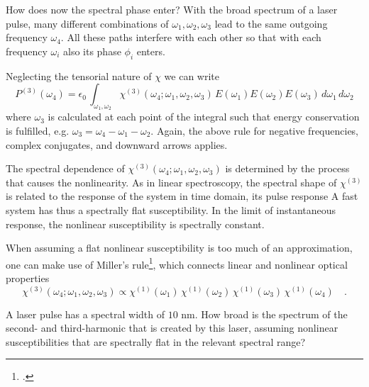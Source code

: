 How does now the spectral phase enter? With the broad spectrum of  a laser pulse, many different combinations of $\omega_1, \omega_2, \omega_3$ lead to the same outgoing frequency $\omega_4$. All these paths interfere with each other so that with each frequency $\omega_i$ also its phase $\phi_i$ enters.

Neglecting the tensorial nature of $\chi$ we can write
\begin{equation}
  P^{(3)}(\omega_4) = \epsilon_0 \, 
    \int_{\omega_1, \omega_2} \chi^{(3)}(\omega_4; \omega_1, \omega_2, \omega_3) \,  E(\omega_1) E(\omega_2) E(\omega_3) \, d\omega_1 \, d\omega_2  
\end{equation}	
where $\omega_3$ is calculated at each point of the integral such that energy conservation is fulfilled, e.g. $\omega_3 = \omega_4 - \omega_1 - \omega_2$. Again, the above rule for negative frequencies, complex conjugates, and downward arrows applies.

The spectral dependence of $\chi^{(3)}(\omega_4; \omega_1, \omega_2, \omega_3)$ is determined by the process that causes the nonlinearity. As in linear spectroscopy, the spectral shape of  $\chi^{(3)}$ is related to the response of the system in time domain, its pulse response A fast system has thus a spectrally flat susceptibility. In the limit of instantaneous response, the nonlinear susceptibility is spectrally constant.
		
When assuming a flat nonlinear susceptibility is too much of an approximation, one can make use of Miller's rule\footcite{Boyd2008,Miller64,Obermeier18}, which connects linear and nonlinear optical properties
\begin{equation}
  \chi^{(3)}(\omega_4; \omega_1, \omega_2, \omega_3) \propto  \chi^{(1)}(\omega_1) \,   \chi^{(1)}(\omega_2)  \,   \chi^{(1)}(\omega_3)  \,   \chi^{(1)}(\omega_4)  \quad .
 \end{equation}
 		
\begin{questions}
\item A laser pulse has a spectral width of $10$ nm. How broad is the spectrum of the second- and third-harmonic that is created by this laser, assuming nonlinear susceptibilities that are spectrally flat in the relevant spectral range?
\end{questions}
 
\printbibliography[segment=\therefsegment,heading=subbibliography]

